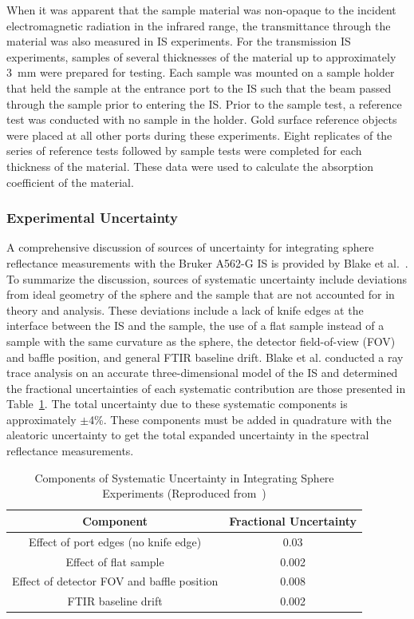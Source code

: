 \documentclass[12pt,oneside]{book}
\begin{document}
When it was apparent that the sample material was non-opaque to the incident electromagnetic radiation in the infrared range, the transmittance through the material was also measured in IS experiments. For the transmission IS experiments, samples of several thicknesses of the material up to approximately 3~mm were prepared for testing. Each sample was mounted on a sample holder that held the sample at the entrance port to the IS such that the beam passed through the sample prior to entering the IS. Prior to the sample test, a reference test was conducted with no sample in the holder. Gold surface reference objects were placed at all other ports during these experiments. Eight replicates of the series of reference tests followed by sample tests were completed for each thickness of the material. These data were used to calculate the absorption coefficient of the material. 

\subsubsection{Experimental Uncertainty}

A comprehensive discussion of sources of uncertainty for integrating sphere reflectance measurements with the Bruker A562-G IS is provided by Blake et al.~\cite{Blake_2018}. To summarize the discussion, sources of systematic uncertainty include deviations from ideal geometry of the sphere and the sample that are not accounted for in theory and analysis. These deviations include a lack of knife edges at the interface between the IS and the sample, the use of a flat sample instead of a sample with the same curvature as the sphere, the detector field-of-view (FOV) and baffle position, and general FTIR baseline drift. Blake et al. conducted a ray trace analysis on an accurate three-dimensional model of the IS and determined the fractional uncertainties of each systematic contribution are those presented in Table~\ref{tab:IS_uncertainty}. The total uncertainty due to these systematic components is approximately $\pm$4\%. These components must be added in quadrature with the aleatoric uncertainty to get the total expanded uncertainty in the spectral reflectance measurements.

\begin{table}[!ht]{}
\centering
\caption[Components of Systematic Uncertainty in Integrating Sphere Experiments]{Components of Systematic Uncertainty in Integrating Sphere Experiments (Reproduced from~\cite{Blake_2018})}
{\begin{tabular}{cc}
\toprule
Component                         & Fractional Uncertainty  \\
\midrule
Effect of port edges (no knife edge)        & 0.03 					    \\ 
Effect of flat sample                       & 0.002                       \\ 
Effect of detector FOV and baffle position  & 0.008                       \\ 
FTIR baseline drift                         & 0.002                       \\ 
\bottomrule
\end{tabular}}
\label{tab:IS_uncertainty}
\end{table}
\end{document}
